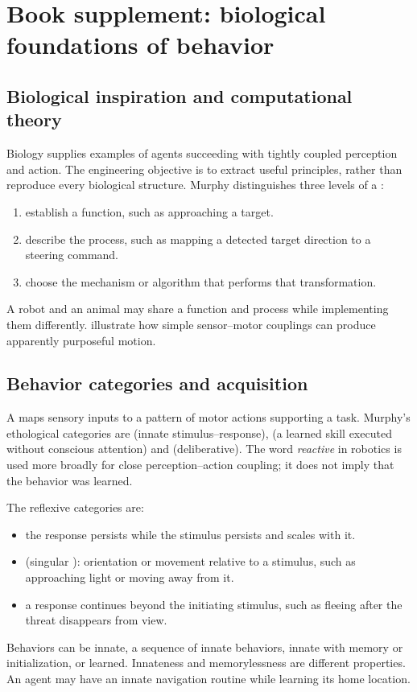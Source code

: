 \section{Book supplement: biological foundations of behavior}
\subsection{Biological inspiration and computational theory}
Biology supplies examples of agents succeeding with tightly coupled perception and action. The engineering objective is to extract useful principles, rather than reproduce every biological structure. Murphy distinguishes three levels of a :
\begin{enumerate}
\item {} establish a function, such as approaching a target.
\item {} describe the process, such as mapping a detected target direction to a steering command.
\item {} choose the mechanism or algorithm that performs that transformation.
\end{enumerate}
A robot and an animal may share a function and process while implementing them differently.  illustrate how simple sensor--motor couplings can produce apparently purposeful motion.

\subsection{Behavior categories and acquisition}
A  maps sensory inputs to a pattern of motor actions supporting a task. Murphy's ethological categories are  (innate stimulus--response),  (a learned skill executed without conscious attention) and  (deliberative). The word \emph{reactive} in robotics is used more broadly for close perception--action coupling; it does not imply that the behavior was learned.

The reflexive categories are:
\begin{itemize}
\item {} the response persists while the stimulus persists and scales with it.
\item {} (singular ): orientation or movement relative to a stimulus, such as approaching light or moving away from it.
\item {} a response continues beyond the initiating stimulus, such as fleeing after the threat disappears from view.
\end{itemize}
Behaviors can be innate, a sequence of innate behaviors, innate with memory or initialization, or learned. Innateness and memorylessness are different properties. An agent may have an innate navigation routine while learning its home location.

